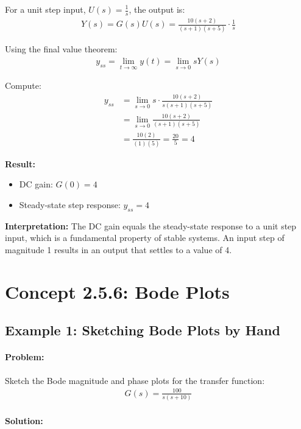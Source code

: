 \documentclass[11pt,a4paper]{article}
\begin{document}
For a unit step input, $U(s) = \frac{1}{s}$, the output is:
\begin{align}
Y(s) = G(s)U(s) = \frac{10(s+2)}{(s+1)(s+5)} \cdot \frac{1}{s}
\end{align}

Using the final value theorem:
\begin{align}
y_{ss} = \lim_{t \to \infty} y(t) = \lim_{s \to 0} sY(s)
\end{align}

Compute:
\begin{align}
y_{ss} &= \lim_{s \to 0} s \cdot \frac{10(s+2)}{s(s+1)(s+5)} \\
&= \lim_{s \to 0} \frac{10(s+2)}{(s+1)(s+5)} \\
&= \frac{10(2)}{(1)(5)} = \frac{20}{5} = 4
\end{align}

\textbf{Result:} 
\begin{itemize}
\item DC gain: $G(0) = 4$
\item Steady-state step response: $y_{ss} = 4$
\end{itemize}

\textbf{Interpretation:} The DC gain equals the steady-state response to a unit step input, which is a fundamental property of stable systems. An input step of magnitude 1 results in an output that settles to a value of 4.

\section{Concept 2.5.6: Bode Plots}

\subsection{Example 1: Sketching Bode Plots by Hand}

\paragraph{Problem:} Sketch the Bode magnitude and phase plots for the transfer function:
\begin{align}
G(s) = \frac{100}{s(s+10)}
\end{align}

\paragraph{Solution:}
\end{document}
